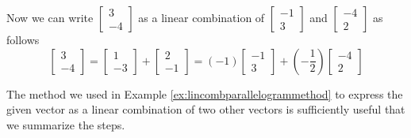 \documentclass{ximera}
\begin{document}
\begin{example}
\begin{explanation}
Now we can write $\begin{bmatrix}3\\-4\end{bmatrix}$ as a linear combination of $\begin{bmatrix}-1\\3\end{bmatrix}$ and $\begin{bmatrix}-4\\2\end{bmatrix}$ as follows
 $$\begin{bmatrix}3\\-4\end{bmatrix}=\begin{bmatrix}1\\-3\end{bmatrix}+\begin{bmatrix}2\\-1\end{bmatrix}=(-1)\begin{bmatrix}-1\\3\end{bmatrix}+\left(-\frac{1}{2}\right)\begin{bmatrix}-4\\2\end{bmatrix}$$
 
\end{explanation}
\end{example}

The method we used in Example \ref{ex:lincombparallelogrammethod} to express the given vector as a linear combination of two other vectors is sufficiently useful that we summarize the steps.
\end{document}
